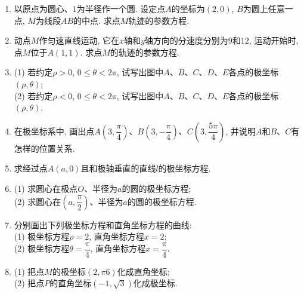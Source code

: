 \documentclass[10pt,a4paper]{article}
\begin{document}
\begin{enumerate}[1.]
\item 以原点为圆心、$1$为半径作一个圆. 设定点$A$的坐标为$(2,0)$, $B$为圆上任意一点, $M$为线段$AB$的中点. 求点$M$轨迹的参数方程.
\item 动点$M$作匀速直线运动, 它在$x$轴和$y$轴方向的分速度分别为$9$和$12$, 运动开始时, 点$M$位于$A(1,1)$. 求点$M$的轨迹的参数方程. 
\item (1) 若约定$\rho>0$, $0\le \theta <2\pi$, 试写出图中$A$、$B$、$C$、$D$、$E$各点的极坐标$(\rho,\theta)$;\\
(2) 若约定$\rho<0$, $0\le\theta <2\pi$, 试写出图中$A$、$B$、$C$、$D$、$E$各点的极坐标$(\rho,\theta)$.
\begin{center}
\end{center}
\item 在极坐标系中, 画出点$A(3,\dfrac \pi 4)$、$B(3,-\dfrac \pi 4)$、$C(3,\dfrac{5\pi} 4)$, 并说明$A$和$B$、$C$有怎样的位置关系. 
\item 求经过点$A(a,0)$且和极轴垂直的直线$l$的极坐标方程.
\item (1) 求圆心在极点$O$、半径为$a$的圆的极坐标方程;\\
(2) 求圆心在$(a,\dfrac \pi 2)$、半径为$a$的圆的极坐标方程.
\item 分别画出下列极坐标方程和直角坐标方程的曲线:\\
(1) 极坐标方程$\rho=2$, 直角坐标方程$x=2$;\\
(2) 极坐标方程$\theta=\dfrac \pi 4$, 直角坐标方程$x=\dfrac \pi 4$. 
\item (1) 把点$M$的极坐标$(2,\pi 6)$化成直角坐标;\\
(2) 把点$P$的直角坐标$(-1,\sqrt 3)$化成极坐标.

\end{enumerate}
\end{document}
